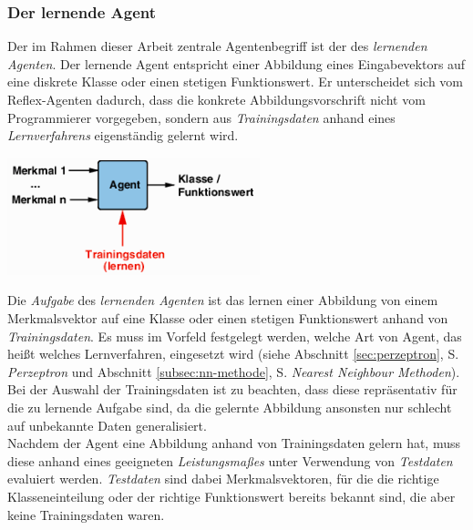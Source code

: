 \documentclass[fontsize=11pt]{scrartcl}
\newenvironment{Figure}
  {\par\medskip\noindent\minipage{\linewidth}}
  {\endminipage\par\medskip}
\newcommand*{\quelle}{%
  \footnotesize Quelle: 
}
\begin{document}
            \subsubsection{Der lernende Agent}
            \label{subsec:lernenderagent}
                Der im Rahmen dieser Arbeit zentrale Agentenbegriff ist der des \emph{lernenden Agenten}. Der lernende Agent entspricht einer Abbildung eines Eingabevektors auf eine diskrete Klasse oder einen stetigen Funktionswert. Er unterscheidet sich vom Reflex-Agenten dadurch, dass die konkrete Abbildungsvorschrift nicht vom Programmierer vorgegeben, sondern aus \emph{Trainingsdaten} anhand eines \emph{Lernverfahrens} eigenständig gelernt wird\cite{ertel2016}.
                \begin{Figure}
                   \centering
                   \includegraphics[scale=1]{lernenderagent.png}
                   \raggedleft\footnotesize\cite[S.194, Abb. 8.4(rechts)]{ertel2016}
                \end{Figure}
                Die \emph{Aufgabe} des \emph{lernenden Agenten} ist das lernen einer Abbildung von einem Merkmalsvektor auf eine Klasse oder einen stetigen Funktionswert anhand von \emph{Trainingsdaten}. Es muss im Vorfeld festgelegt werden, welche Art von Agent, das heißt welches Lernverfahren, eingesetzt wird (siehe Abschnitt \ref{sec:perzeptron}, S. \pageref{sec:perzeptron} \emph{Perzeptron} und Abschnitt \ref{subsec:nn-methode}, S. \pageref{subsec:nn-methode} \emph{Nearest Neighbour Methoden}).
                Bei der Auswahl der Trainingsdaten ist zu beachten, dass diese repräsentativ für die zu lernende Aufgabe sind, da die gelernte Abbildung ansonsten nur schlecht auf unbekannte Daten generalisiert.\\
                Nachdem der Agent eine Abbildung anhand von Trainingsdaten gelern hat, muss diese anhand eines geeigneten \emph{Leistungsmaßes} unter Verwendung von \emph{Testdaten} evaluiert werden. \emph{Testdaten} sind dabei Merkmalsvektoren, für die  die richtige Klasseneinteilung oder der richtige Funktionswert bereits bekannt sind, die aber keine Trainingsdaten waren.\cite{ertel2016}
\end{document}
